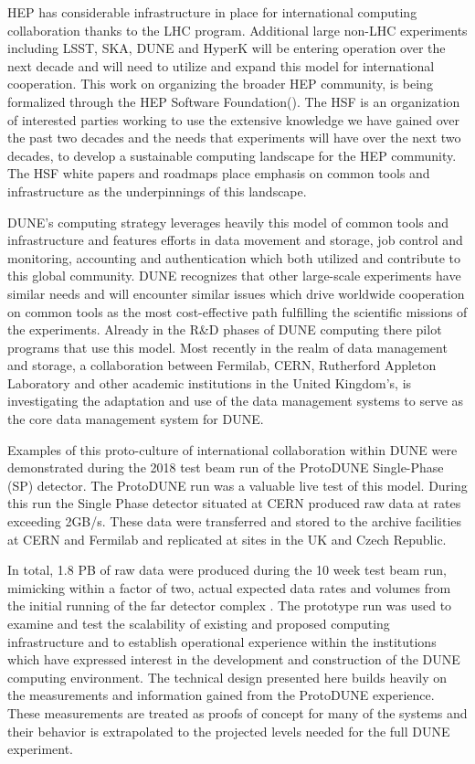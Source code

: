 HEP has considerable infrastructure in place for international computing collaboration thanks to the LHC program.  Additional large non-LHC experiments including LSST, SKA, DUNE and HyperK will be entering operation over the next decade and will need to utilize and expand this model for international cooperation.  This work on organizing the broader HEP community, is being formalized through the HEP Software Foundation().  The HSF is an organization of interested parties working to use the extensive knowledge we have gained over the past two decades and the needs that experiments will have over the next two decades, to develop a sustainable computing landscape for the HEP community.  The HSF white papers and roadmaps place emphasis on common tools and infrastructure as the underpinnings of this landscape.

DUNE's computing strategy leverages heavily this model of common tools and infrastructure and features efforts in data movement and storage, job control and monitoring, accounting and authentication which both utilized and contribute to this global community.   DUNE recognizes that other large-scale experiments have similar needs and will encounter similar issues which drive worldwide cooperation on common tools as the most cost-effective path fulfilling the scientific missions of the experiments.  Already in the R\&D phases of DUNE computing there pilot programs that use this model.  Most recently in the realm of data management and storage, a collaboration between Fermilab, CERN, Rutherford Appleton Laboratory and other academic institutions in the United Kingdom's, is investigating the adaptation and use of the {\it {}}\cite{Barisits:2019fyl} data management systems to serve as the core data management system for DUNE.

Examples of this proto-culture of international collaboration within DUNE were demonstrated during the 2018 test beam run of the ProtoDUNE Single-Phase (SP) detector.  The ProtoDUNE run was a valuable live test of this model.  During this run the Single Phase detector situated at CERN produced raw data at rates exceeding 2GB/s.  These data were transferred and stored to the archive facilities at CERN and Fermilab and replicated at sites in the UK and Czech Republic.

In total, 1.8 PB of raw data were produced during the 10 week test beam run, mimicking within a factor of two, actual expected data rates and volumes from the initial running of the far detector complex .  The prototype run was used to examine and test the scalability of existing and proposed computing infrastructure and to establish operational experience within the institutions which have expressed interest in the development and construction of the DUNE computing environment.  The technical design presented here builds heavily on the measurements and information gained from the ProtoDUNE experience.   These measurements are treated as proofs of concept for many of the systems and their behavior is extrapolated to the projected levels needed for the full DUNE experiment.

